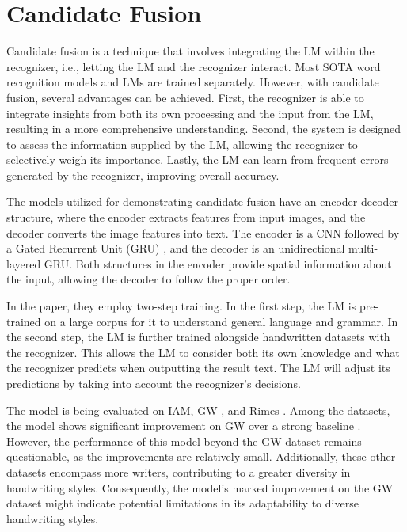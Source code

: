 \section{Candidate Fusion}
\label{sec:2_candidate_fusion}
Candidate fusion \citep{kang2021candidate} is a technique that involves integrating the LM within the recognizer, i.e., letting the LM and the recognizer interact. Most SOTA word recognition models and LMs are trained separately. However, with candidate fusion, several advantages can be achieved. First, the recognizer is able to integrate insights from both its own processing and the input from the LM, resulting in a more comprehensive understanding. Second, the system is designed to assess the information supplied by the LM, allowing the recognizer to selectively weigh its importance. Lastly, the LM can learn from frequent errors generated by the recognizer, improving overall accuracy.

The models utilized for demonstrating candidate fusion have an encoder-decoder structure, where the encoder extracts features from input images, and the decoder converts the image features into text. The encoder is a CNN followed by a Gated Recurrent Unit (GRU) \citep{dey2017gate}, and the decoder is an unidirectional multi-layered GRU. Both structures in the encoder provide spatial information about the input, allowing the decoder to follow the proper order.

In the paper, they employ two-step training. In the first step, the LM is pre-trained on a large corpus for it to understand general language and grammar. In the second step, the LM is further trained alongside handwritten datasets with the recognizer. This allows the LM to consider both its own knowledge and what the recognizer predicts when outputting the result text. The LM will adjust its predictions by taking into account the recognizer's decisions.

The model is being evaluated on IAM, GW \citep{fischer2012lexicon}, and Rimes \citep{grosicki2011icdar}. Among the datasets, the model shows significant improvement on GW over a strong baseline \citep{8395102}. However, the performance of this model beyond the GW dataset remains questionable, as the improvements are relatively small. Additionally, these other datasets encompass more writers, contributing to a greater diversity in handwriting styles. Consequently, the model's marked improvement on the GW dataset might indicate potential limitations in its adaptability to diverse handwriting styles.

